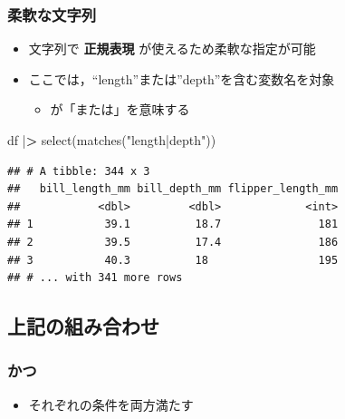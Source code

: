 \documentclass[
  xelatex,ja=standard, b5paper]{bxjsbook}
\newenvironment{Shaded}{\begin{snugshade}}{\end{snugshade}}
\newcommand{\ErrorTok}[1]{\textcolor[rgb]{0.64,0.00,0.00}{\textbf{#1}}}
\newcommand{\FunctionTok}[1]{\textcolor[rgb]{0.00,0.00,0.00}{#1}}
\newcommand{\NormalTok}[1]{#1}
\newcommand{\SpecialCharTok}[1]{\textcolor[rgb]{0.00,0.00,0.00}{#1}}
\newcommand{\StringTok}[1]{\textcolor[rgb]{0.31,0.60,0.02}{#1}}
\providecommand{\tightlist}{%
  \setlength{\itemsep}{0pt}\setlength{\parskip}{0pt}}
\begin{document}
\hypertarget{select-helper4}{%
\subsubsection{柔軟な文字列}\label{select-helper4}}

\begin{itemize}
\tightlist
\item
  文字列で \textbf{正規表現} が使えるため柔軟な指定が可能
\item
  ここでは，``length''または''depth''を含む変数名を対象

  \begin{itemize}
  \tightlist
  \item
    \texttt{\textbar{}}が「または」を意味する
  \end{itemize}
\end{itemize}

\begin{Shaded}
\begin{Highlighting}[]
\NormalTok{df }\SpecialCharTok{|}\ErrorTok{\textgreater{}}
  \FunctionTok{select}\NormalTok{(}\FunctionTok{matches}\NormalTok{(}\StringTok{"length|depth"}\NormalTok{))}
\end{Highlighting}
\end{Shaded}

\begin{verbatim}
## # A tibble: 344 x 3
##   bill_length_mm bill_depth_mm flipper_length_mm
##            <dbl>         <dbl>             <int>
## 1           39.1          18.7               181
## 2           39.5          17.4               186
## 3           40.3          18                 195
## # ... with 341 more rows
\end{verbatim}

\hypertarget{select-helper5}{%
\subsection{上記の組み合わせ}\label{select-helper5}}

\hypertarget{select-helper5-1}{%
\subsubsection{かつ}\label{select-helper5-1}}

\begin{itemize}
\tightlist
\item
  それぞれの条件を両方満たす
\end{itemize}
\end{document}
